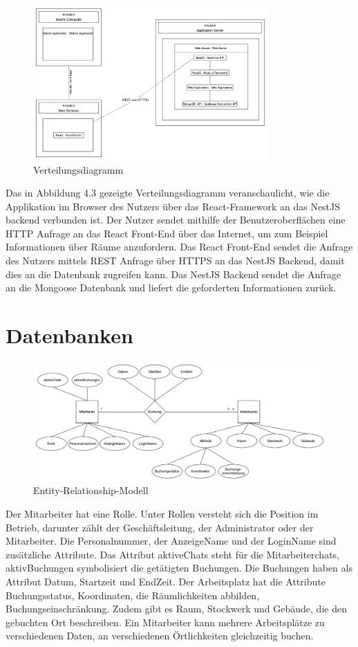 \begin{figure}[!h]
    \centering
    \includegraphics[width=0.8\textwidth]{./UML_Diagrams/Verteilungsdiagramm.png}
    \caption{Verteilungsdiagramm}
    \label{fig:Verteilungsdiagramm}
\end{figure}

Das in Abbildung 4.3 gezeigte Verteilungsdiagramm veranschaulicht, wie die Applikation im Browser des Nutzers über das React-Framework an das NestJS backend verbunden ist.
Der Nutzer sendet mithilfe der Benutzeroberflächen eine HTTP Anfrage an das React Front-End über das Internet, um zum Beispiel Informationen über Räume anzufordern.
Das React Front-End sendet die Anfrage des Nutzers mittels REST Anfrage über HTTPS an das NestJS Backend, damit dies an die Datenbank zugreifen kann.
Das NestJS Backend sendet die Anfrage an die Mongoose Datenbank und liefert die geforderten Informationen zurück.

\pagebreak
\section{Datenbanken}
\begin{figure}[!h]
    \centering
    \includegraphics[width=1\textwidth]{./images/EntityRelationshipModel.png}
    \caption{Entity-Relationship-Modell}
    \label{fig:EntityRelationshipModel}
\end{figure}
Der Mitarbeiter hat eine Rolle. Unter Rollen versteht sich die Position im Betrieb, darunter zählt der Geschäftsleitung, der Administrator oder 
der Mitarbeiter. Die Personalnummer, der AnzeigeName und der LoginName sind zusätzliche Attribute. Das Attribut aktiveChats 
steht für die Mitarbeiterchats, aktivBuchungen symbolisiert die getätigten Buchungen. Die Buchungen haben als Attribut Datum, Startzeit 
und EndZeit. Der Arbeitsplatz hat die Attribute Buchungsstatus, Koordinaten, die Räumlichkeiten abbilden, Buchungseinschränkung. 
Zudem gibt es Raum, Stockwerk und Gebäude, die den gebuchten Ort beschreiben. 
Ein Mitarbeiter kann mehrere Arbeitsplätze zu verschiedenen Daten, an verschiedenen Örtlichkeiten gleichzeitig buchen. 
